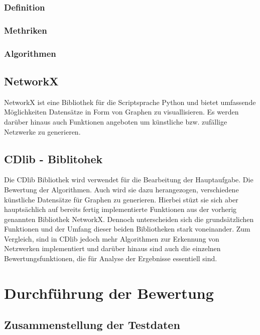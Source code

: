 \subsection{Definition}\label{Definition}

\subsection{Methriken}\label{Methriken}

\subsection{Algorithmen}\label{Algorithmen}

\section{NetworkX}\label{NetworkX}
NetworkX ist eine Bibliothek für die Scriptsprache Python und bietet umfassende Möglichkeiten Datensätze in Form von Graphen zu visuallisieren. Es werden darüber hinaus auch Funktionen angeboten um künstliche bzw. zufällige Netzwerke zu generieren.

\section{CDlib - Biblitohek}\label{CDlib - Bibliothek}
Die CDlib Bibliothek wird verwendet für die Bearbeitung der Hauptaufgabe. Die Bewertung der Algorithmen. Auch wird sie dazu herangezogen, verschiedene künstliche Datensätze für Graphen zu generieren. Hierbei stüzt sie sich aber hauptsächlich auf bereits fertig implementierte Funktionen aus der vorherig genannten Bibliothek NetworkX. Dennoch unterscheiden sich die grundsätzlichen Funktionen und der Umfang dieser beiden Bibliotheken stark voneinander. Zum Vergleich, sind in CDlib jedoch mehr Algorithmen zur Erkennung von Netzwerken implementiert und darüber hinaus sind auch die einzelnen Bewertungsfunktionen, die für Analyse der Ergebnisse essentiell sind.

\chapter{Durchführung der Bewertung}

\section{Zusammenstellung der Testdaten}\label{Zusammenstellung der Testdaten}

